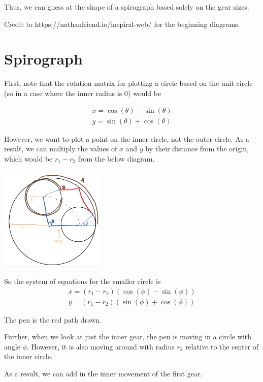 \documentclass{article}
\begin{document}
Thus, we can guess at the shape of a spirograph based solely on the gear sizes. 

Credit to https://nathanfriend.io/inspiral-web/ for the beginning diagrams. 

\section{Spirograph}

First, note that the rotation matrix for plotting a circle based on the unit circle (so in a case where the inner radius is $0$) would be 

\begin{align*}
    x = \cos(\theta) - \sin(\theta) \\
    y = \sin(\theta) + \cos(\theta)
\end{align*}

However, we want to plot a point on the inner circle, not the outer circle. As a result, we can multiply the values of $x$ and $y$ by their distance from the origin, which would be $r_1 - r_2$ from the below diagram. 

\begin{center}
\includegraphics[height=5cm]{images/Angle Diagram (1).png}
\end{center}

So the system of equations for the smaller circle is 
\begin{align*}
    x = (r_1 - r_2) \left( \cos(\phi) - \sin(\phi) \right)\\
    y = (r_1 - r_2) \left( \sin(\phi) + \cos(\phi) \right)
\end{align*}

The pen is the red path drawn. 

Further, when we look at just the inner gear, the pen is moving in a circle with angle $\phi.$ However, it is also moving around with radius $r_2$ relative to the center of the inner circle. 

As a result, we can add in the inner movement of the first gear. 
\end{document}
